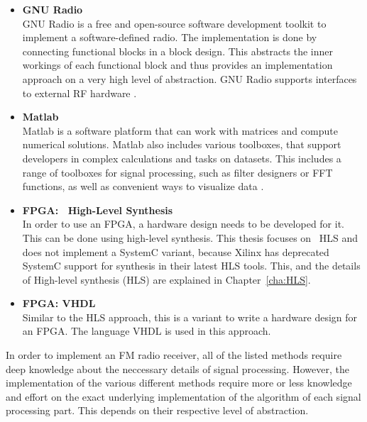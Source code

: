 \begin{itemize}
  \item \textbf{GNU Radio}\\
      GNU Radio is a free and open-source software development toolkit to implement a software-defined radio.
      The implementation is done by connecting functional blocks in a block design.
      This abstracts the inner workings of each functional block and thus provides an implementation approach on a very high level of abstraction.
      GNU Radio supports interfaces to external RF hardware \cite{SoftwareGnuRadio}.\\
  \item \textbf{Matlab}\\
      Matlab is a software platform that can work with matrices and compute numerical solutions.
      Matlab also includes various toolboxes, that support developers in complex calculations and tasks on datasets.
      This includes a range of toolboxes for signal processing, such as filter designers or FFT functions, as well as convenient ways to visualize data \cite{SoftwareMatlab}.\\
  \item \textbf{FPGA: \cplusplus\ High-Level Synthesis}\\
      In order to use an FPGA, a hardware design needs to be developed for it.
      This can be done using high-level synthesis.
      This thesis focuses on \cplusplus\ HLS and does not implement a SystemC variant, because Xilinx has deprecated SystemC support for synthesis in their latest HLS tools.
      This, and the details of High-level synthesis (HLS) are explained in Chapter~\ref{cha:HLS}.\\

  \item \textbf{FPGA: VHDL}\\
      Similar to the HLS approach, this is a variant to write a hardware design for an FPGA.
      The language VHDL is used in this approach.\\
\end{itemize}

In order to implement an FM radio receiver, all of the listed methods require deep knowledge about the neccessary details of signal processing.
However, the implementation of the various different methods require more or less knowledge and effort on the exact underlying implementation of the algorithm of each signal processing part.
This depends on their respective level of abstraction.

